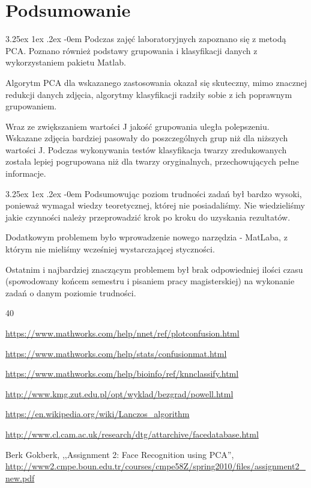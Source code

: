 \documentclass[11pt, a4paper]{article}
\makeatletter
\newcommand{\fbi}{\leavevmode{\parindent=1em\indent}}
\renewcommand\paragraph{\@startsection{paragraph}{5}{\z@}
  {3.25ex \@plus1ex \@minus.2ex}
  {-0em}
  {\normalfont\normalsize\bfseries}}
\makeatother
\begin{document}
\section{Podsumowanie}
\paragraph{}
Podczas zajęć laboratoryjnych zapoznano się z metodą PCA. Poznano również podstawy grupowania i klasyfikacji danych z wykorzystaniem pakietu Matlab.

\fbi
Algorytm PCA dla wskazanego zastosowania okazał się skuteczny, mimo znacznej redukcji danych zdjęcia, algorytmy klasyfikacji radziły sobie z ich poprawnym grupowaniem.

\fbi
Wraz ze zwiększaniem wartości J jakość grupowania uległa polepszeniu. Wskazane zdjęcia bardziej pasowały do poszczególnych grup niż dla niższych wartości J. Podczas wykonywania testów klasyfikacja twarzy zredukowanych została lepiej pogrupowana niż dla twarzy oryginalnych, przechowujących pełne informacje.

\paragraph{}
\fbi
Podsumowując poziom trudności zadań był bardzo wysoki, ponieważ wymagał wiedzy teoretycznej, której nie posiadaliśmy. Nie wiedzieliśmy jakie czynności należy przeprowadzić krok po kroku do uzyskania rezultatów.

\fbi
Dodatkowym problemem było wprowadzenie nowego narzędzia - MatLaba, z którym nie mieliśmy wcześniej wystarczającej styczności.

\fbi
Ostatnim i najbardziej znaczącym problemem był brak odpowiedniej ilości czasu (spowodowany końcem semestru i pisaniem pracy magisterskiej) na wykonanie zadań o danym poziomie trudności.

\newpage
\begin{thebibliography}{40}

\url{https://www.mathworks.com/help/nnet/ref/plotconfusion.html}

\url{https://www.mathworks.com/help/stats/confusionmat.html}

\url{https://www.mathworks.com/help/bioinfo/ref/knnclassify.html}

\url{http://www.kmg.zut.edu.pl/opt/wyklad/bezgrad/powell.html}

\url{https://en.wikipedia.org/wiki/Lanczos_algorithm}

\url{http://www.cl.cam.ac.uk/research/dtg/attarchive/facedatabase.html}

Berk Gokberk, ,,Assignment 2: Face Recognition using PCA'',
\url{http://www2.cmpe.boun.edu.tr/courses/cmpe58Z/spring2010/files/assignment2_new.pdf}


\end{thebibliography}
\end{document}
